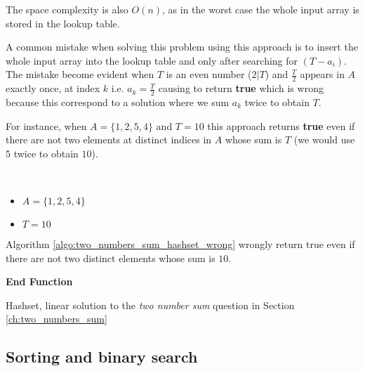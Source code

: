 The space complexity is also $O(n)$, as in the worst case the whole input array is stored in the lookup table.


A common mistake when solving this problem using this approach is to insert the whole input array into the lookup table and only after searching for $(T-a_i)$.
The mistake become evident when $T$ is
an even number ($2 | T$) and $\frac{T}{2}$ appears in $A$  exactly once, at index $k$ i.e. $a_k = \frac{T}{2}$ causing
 to return \textbf{true} which is wrong because this correspond to a solution where we sum $a_k$ twice to obtain $T$.

For instance, when $A=\{1,2,5,4\}$ and $T=10$ this approach returns \textbf{true} even if there are not two elements at distinct indices in $A$ whose sum is $T$ (we would use $5$ twice to obtain $10$).
\begin{example}
	\hfill \\ 
	\begin{itemize}
		\item[] $A=\{1,2,5,4\}$
	\item[] $T = 10$
\end{itemize}
	Algorithm \ref{algo:two_numbers_sum_hashset_wrong} wrongly return true even if there are not two
	distinct elements whose sum is $10$.
\end{example}


\begin{algorithm}
	 
	   
	
	 \textbf{End Function}
		\caption{Hashset, linear solution to the \textit{two number sum} question in Section
		\label{algo:two_numbers_sum_hashset_wrong}
	\ref{ch:two_numbers_sum} }
\end{algorithm}


\subsection{Sorting and binary search}
\label{sect:two_number_problem_binary_search}

